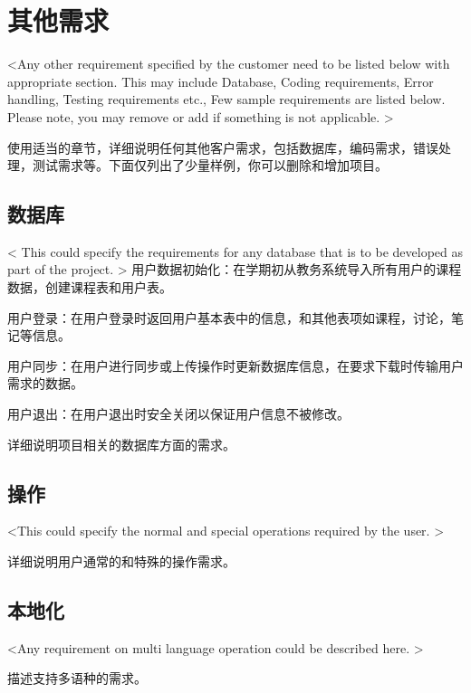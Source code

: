 \chapter{其他需求}
<Any other requirement specified by the customer need to be listed below with appropriate section. This may include Database, Coding requirements, Error handling, Testing requirements etc., Few sample requirements are listed below. Please note, you may remove or add if something is not applicable. >

使用适当的章节，详细说明任何其他客户需求，包括数据库，编码需求，错误处理，测试需求等。下面仅列出了少量样例，你可以删除和增加项目。
\section{数据库}
< This could specify the requirements for any database that is to be developed as part of the project. >
用户数据初始化：在学期初从教务系统导入所有用户的课程数据，创建课程表和用户表。

用户登录：在用户登录时返回用户基本表中的信息，和其他表项如课程，讨论，笔记等信息。

用户同步：在用户进行同步或上传操作时更新数据库信息，在要求下载时传输用户需求的数据。

用户退出：在用户退出时安全关闭以保证用户信息不被修改。

详细说明项目相关的数据库方面的需求。
\section{操作}
<This could specify the normal and special operations required by the user. >

详细说明用户通常的和特殊的操作需求。
\section{本地化}
<Any requirement on multi language operation could be described here. >

描述支持多语种的需求。
